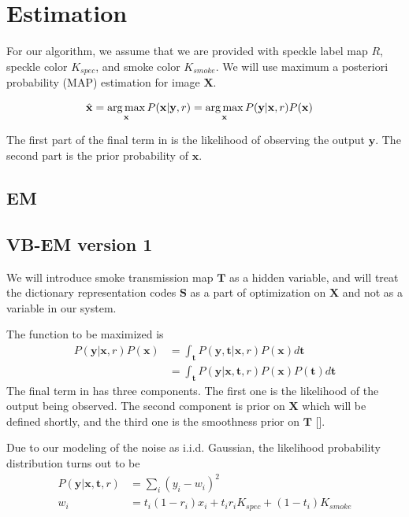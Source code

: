\chapter{Estimation}

For our algorithm, we assume that we are provided with speckle label map $R$, speckle color $K_{spec}$, and smoke color $K_{smoke}$. We will use maximum a posteriori probability (MAP) estimation for image $\mathbf{X}$.

\begin{align}
\hat{\mathbf{x}} &= \operatorname*{arg\,max}_\mathbf{x} P ( \mathbf{x} | \mathbf{y}, r) = \operatorname*{arg\,max}_\mathbf{x} P(\mathbf{y} | \mathbf{x}, r) P( \mathbf{x} ) \label{eqn:simplemap}
\end{align}

The first part of the final term in  is the likelihood of observing the output $\mathbf{y}$. The second part is the prior probability of $\mathbf{x}$.

\section{EM}

\section{VB-EM version 1}
We will introduce smoke transmission map $\mathbf{T}$ as a hidden variable, and will treat the dictionary representation codes $\mathbf{S}$ as a part of optimization on $\mathbf{X}$ and not as a variable in our system.

The function to be maximized is
\begin{align}
P(\mathbf{y} | \mathbf{x}, r) P( \mathbf{x} ) &= \int_{\mathbf{t}} P(\mathbf{y}, \mathbf{t}| \mathbf{x}, r) P( \mathbf{x} ) d\mathbf{t}\nonumber \\
&= \int_{\mathbf{t}} P(\mathbf{y}| \mathbf{x}, \mathbf{t}, r) P( \mathbf{x} ) P( \mathbf{t} ) d\mathbf{t} \label{eqn:mapvbem1}
\end{align}
The final term in  has three components. The first one is the likelihood of the output being observed. The second component is prior on $\mathbf{X}$ which will be defined shortly, and the third one is the smoothness prior on $\mathbf{T}$ [].

Due to our modeling of the noise as i.i.d. Gaussian, the likelihood probability distribution turns out to be
\begin{align}
P(\mathbf{y}| \mathbf{x}, \mathbf{t}, r) &= \sum_i \left(  y_i - w_i \right)^2 \\
w_i &= t_i (1-r_i) x_i + t_i r_i K_{spec} + (1-t_i) K_{smoke} 
\end{align}

